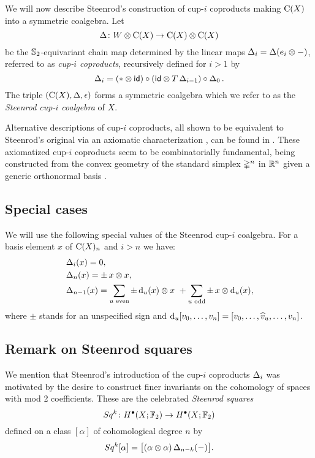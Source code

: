 We will now describe Steenrod's construction of cup-$i$ coproducts \cite[p.293]{steenrod1947products} making $\operatorname{C}(X)$ into a symmetric coalgebra.
Let
\[
\operatorname{\Delta} \colon W \otimes \operatorname{C}(X) \to \operatorname{C}(X) \otimes \operatorname{C}(X)
\]
be the $\mathbb{S}_2$-equivariant chain map determined by the linear maps $\operatorname{\Delta}_i = \operatorname{\Delta}(e_i \otimes -)$, referred to as \textit{cup-$i$ coproducts}, recursively defined for $i > 1$ by
\begin{equation*} \label{e:cup-i coproducts}
	\operatorname{\Delta}_i =
	(\ast \otimes \mathsf{id}) \circ (\mathsf{id} \otimes T\operatorname{\Delta}_{i-1}) \circ \operatorname{\Delta}_0.
\end{equation*}
The triple $(\operatorname{C}(X), \operatorname{\Delta}, \operatorname{\epsilon})$ forms a symmetric coalgebra which we refer to as the \textit{Steenrod cup-$i$ coalgebra} of $X$.

Alternative descriptions of cup-$i$ coproducts, all shown to be equivalent to Steenrod's original via an axiomatic characterization \cite{medina2022axiomatic}, can be found in \cite{real1996computability, gonzalez-diaz1999steenrod, mcclure2003multivariable, medina2021fast_sq}.
These axiomatized cup-$i$ coproducts seem to be combinatorially fundamental, being constructed from the convex geometry of the standard simplex $\mathbb{\Delta}^n$ in $\mathbb{R}^n$ given a generic orthonormal basis \cite{medina2022fib_poly}.

\subsection{Special cases}

We will use the following special values of the Steenrod cup-$i$ coalgebra.
For a basis element $x$ of $\operatorname{C}(X)_n$ and $i > n$ we have:
\begin{align}
	&\operatorname{\Delta}_i(x) = 0, \\
	&\operatorname{\Delta}_n(x) = \pm \, x \otimes x, \\
	&\operatorname{\Delta}_{n-1}(x) =
	\sum_{u \text{ even}} \pm \operatorname{d}_u(x) \otimes x \ +
	\sum_{u \text{ odd}} \pm \, x \otimes \operatorname{d}_u(x),
\end{align}
where $\pm$ stands for an unspecified sign and $\operatorname{d}_u [v_0,\dots,v_n] = [v_0,\dots,\widehat{v}_u,\dots,v_n]$.

\subsection{Remark on Steenrod squares} \label{ss:steenrod squares}

We mention that Steenrod's introduction of the cup-$i$ coproducts $\operatorname{\Delta}_i$ was motivated by the desire to construct finer invariants on the cohomology of spaces with mod 2 coefficients.
These are the celebrated \textit{Steenrod squares}
\[
Sq^k \colon H^\bullet(X; {\mathbb{F}_2}) \to H^\bullet(X; {\mathbb{F}_2})
\]
defined on a class $[\alpha]$ of cohomological degree $n$ by
\[
Sq^k [\alpha] = \big[ (\alpha \otimes \alpha) \operatorname{\Delta}_{n-k}(-) \big].
\]

